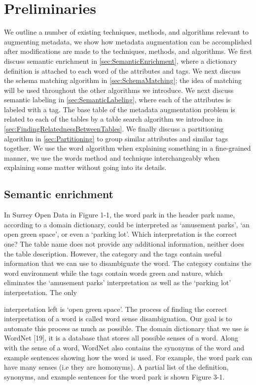 
\chapter{Preliminaries}
\label{ch:Preliminaries}

We outline a number of existing techniques, methods, and algorithms relevant to augmenting metadata, we show how metadata augmentation can be accomplished after modifications are made to the techniques, methods, and algorithms. We first discuss semantic enrichment in \autoref{sec:SemanticEnrichment}, where a dictionary definition is attached to each word of the attributes and tags. We next discuss the schema matching algorithm in \autoref{sec:SchemaMatching}; the idea of matching will be used throughout the other algorithms we introduce. We next discuss semantic labeling in \autoref{sec:SemanticLabeling}, where each of the attributes is labeled with a tag. The base table of the metadata augmentation problem is related to each of the tables by a table search algorithm we introduce in \autoref{sec:FindingRelatednessBetweenTables}. We finally discuss a partitioning algorithm in \autoref{sec:Partitioning} to group similar attributes and similar tags together. We use the word algorithm when explaining something in a fine-grained manner, we use the words method and technique interchangeably when explaining some matter without going into its details.

\section{Semantic enrichment}
\label{sec:SemanticEnrichment}

In Surrey Open Data in Figure 1-1, the word park in the header park name, according to a domain dictionary, could be interpreted as `amusement parks', `an open green space', or even a `parking lot'. Which interpretation is the correct one? The table name does not provide any additional information, neither does the table description. However, the category and the tags contain useful information that we can use to disambiguate the word. The category contains the word environment while the tags contain words green and nature, which eliminates the `amusement parks' interpretation as well as the `parking lot' interpretation. The only

interpretation left is `open green space'. The process of finding the correct interpretation of a word is called word sense disambiguation. Our goal is to automate this process as much as possible.
The domain dictionary that we use is WordNet [19], it is a database that stores all possible senses of a word. Along with the sense of a word, WordNet also contains the synonyms of the word and example sentences showing how the word is used. For example, the word park can have many senses (i.e they are homonyms). A partial list of the definition, synonyms, and example sentences for the word park is shown Figure 3-1.

